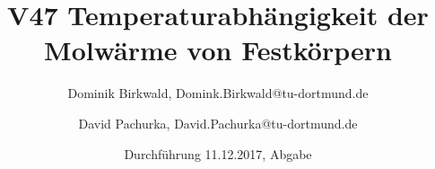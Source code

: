 
\title{V47 Temperaturabhängigkeit der Molwärme von Festkörpern}
\author{Dominik Birkwald, Domink.Birkwald@tu-dortmund.de \and David Pachurka, David.Pachurka@tu-dortmund.de}
\date{Durchführung 11.12.2017, Abgabe }



  \maketitle
  
  
  
  


